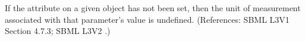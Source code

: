 If the attribute  on a given \Parameter object has not been
set, then the unit of measurement associated with that parameter's value is
undefined.  (References: SBML L3V1 Section 4.7.3; SBML L3V2 .)
